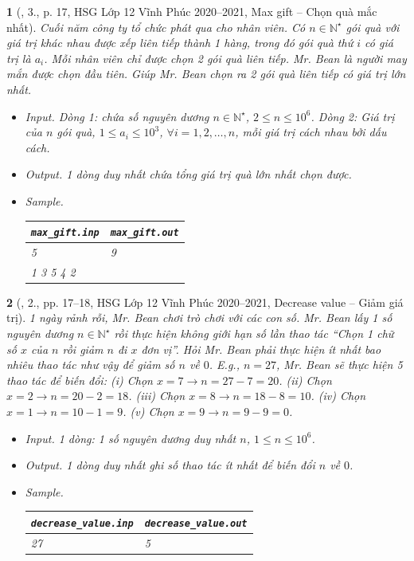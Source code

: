 \documentclass{article}
\newtheorem{baitoan}{}
\begin{document}
\begin{baitoan}[\cite{Trung_HSG_THPT_Tin}, 3., p. 17, HSG Lớp 12 Vĩnh Phúc 2020--2021, Max gift -- Chọn quà mắc nhất]
	Cuối năm công ty tổ chức phát qua cho nhân viên. Có $n\in\mathbb{N}^\star$ gói quà với giá trị khác nhau được xếp liên tiếp thành 1 hàng, trong đó gói quà thứ $i$ có giá trị là $a_i$. Mỗi nhân viên chỉ được chọn 2 gói quà liên tiếp. Mr. Bean là người may mắn được chọn đầu tiên. Giúp Mr. Bean chọn ra 2 gói quà liên tiếp có giá trị lớn nhất.
	\begin{itemize}
		\item {\sf Input.} Dòng 1: chứa số nguyên dương $n\in\mathbb{N}^\star$, $2\le n\le10^6$. Dòng 2: Giá trị của $n$ gói quà, $1\le a_i\le10^3$, $\forall i = 1,2,\ldots,n$, mỗi giá trị cách nhau bởi dấu cách.
		\item {\sf Output.} 1 dòng duy nhất chứa tổng giá trị quà lớn nhất chọn được.
		\item {\sf Sample.}
		\begin{table}[H]
			\centering
			\begin{tabular}{|l|l|}
				\hline
				\verb|max_gift.inp| & \verb|max_gift.out| \\
				\hline
				5 & 9 \\
				1 3 5 4 2 &  \\
				\hline
			\end{tabular}
		\end{table}
	\end{itemize}
\end{baitoan}

\begin{baitoan}[\cite{Trung_HSG_THPT_Tin}, 2., pp. 17--18, HSG Lớp 12 Vĩnh Phúc 2020--2021, Decrease value -- Giảm giá trị]
	1 ngày rảnh rỗi, Mr. Bean chơi trò chơi với các con số. Mr. Bean lấy 1 số nguyên dương $n\in\mathbb{N}^\star$ rồi thực hiện không giới hạn số lần thao tác ``Chọn 1 chữ số $x$ của $n$ rồi giảm $n$ đi $x$ đơn vị''. Hỏi Mr. Bean phải thực hiện ít nhất bao nhiêu thao tác như vậy để giảm số $n$ về $0$. E.g., $n = 27$, Mr. Bean sẽ thực hiện 5 thao tác để biến đổi: (i) Chọn $x = 7\to n = 27 - 7 = 20$. (ii) Chọn $x = 2\to n = 20 - 2 = 18$. (iii) Chọn $x = 8\to n = 18 - 8 = 10$. (iv) Chọn $x = 1\to n = 10 - 1 = 9$. (v) Chọn $x = 9\to n = 9 - 9 = 0$.
	\begin{itemize}
		\item {\sf Input.} 1 dòng: 1 số nguyên dương duy nhất $n$, $1\le n\le10^6$.
		\item {\sf Output.} 1 dòng duy nhất ghi số thao tác ít nhất để biến đổi $n$ về $0$.
		\item {\sf Sample.}
		\begin{table}[H]
			\centering
			\begin{tabular}{|l|l|}
				\hline
				\verb|decrease_value.inp| & \verb|decrease_value.out| \\
				\hline
				27 & 5 \\
				\hline
			\end{tabular}
		\end{table}
	\end{itemize}
\end{baitoan}
\end{document}
